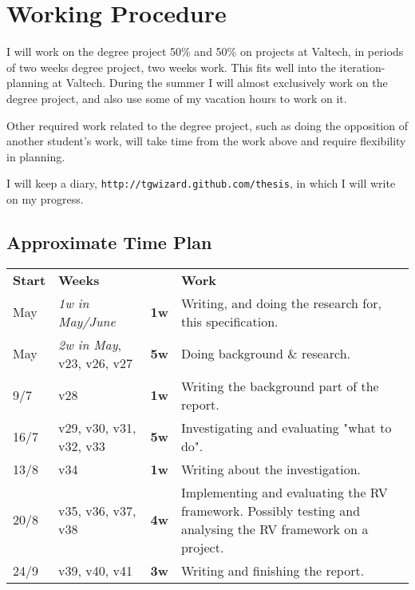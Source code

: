 \documentclass[a4paper,11pt]{article}
\begin{document}
\section{Working Procedure}

I will work on the degree project 50\% and 50\% on projects at Valtech, in periods of
two weeks degree project, two weeks work. This fits well into the iteration-planning at
Valtech. During the summer I will almost exclusively work on the degree project, and also
use some of my vacation hours to work on it.

Other required work related to the degree project, such as doing the opposition of
another student's work, will take time from the work above and require
flexibility in planning.

I will keep a diary, \texttt{http://tgwizard.github.com/thesis}, in which I will write on my progress. 

\subsection{Approximate Time Plan}


\begin{center}
	\renewcommand{\arraystretch}{1.5}
	\begin{tabular}{ l l l | p{8cm} }
		\textbf{Start} & \textbf{Weeks} &  & \textbf{Work} \\
		\noalign{\smallskip}\hline\noalign{\smallskip}
		
		May & \textit{1w in May/June} & \textbf{1w} &
		Writing, and doing the research for, this specification.
		\\
		
		May & \textit{2w in May}, v23, v26, v27 & \textbf{5w} &
		Doing background \& research.
		\\
		
		9/7 & v28 & \textbf{1w} &
		Writing the background part of the report.
		\\
		
		16/7 & v29, v30, v31, v32, v33 & \textbf{5w} &
		Investigating and evaluating "what to do".
		\\
		
		13/8 & v34& \textbf{1w} &
		Writing about the investigation.
		\\
		
		20/8 & v35, v36, v37, v38 & \textbf{4w} &
		Implementing and evaluating the RV framework.
		Possibly testing and analysing the RV framework on a project.
		\\
		
		24/9 & v39, v40, v41 & \textbf{3w} &
		Writing and finishing the report.
		\\
		
	\end{tabular}
\end{center}
\end{document}
